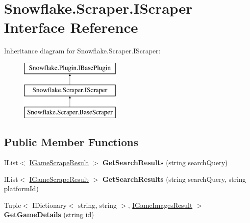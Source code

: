 \hypertarget{interface_snowflake_1_1_scraper_1_1_i_scraper}{}\section{Snowflake.\+Scraper.\+I\+Scraper Interface Reference}
\label{interface_snowflake_1_1_scraper_1_1_i_scraper}
Inheritance diagram for Snowflake.\+Scraper.\+I\+Scraper\+:\begin{figure}[H]
\begin{center}
\leavevmode
\includegraphics[height=3.000000cm]{interface_snowflake_1_1_scraper_1_1_i_scraper}
\end{center}
\end{figure}
\subsection*{Public Member Functions}
\begin{DoxyCompactItemize}
\item 
\hypertarget{interface_snowflake_1_1_scraper_1_1_i_scraper_a133e1a55dd154335843993d3f1166db3}{}I\+List$<$ \hyperlink{interface_snowflake_1_1_scraper_1_1_i_game_scrape_result}{I\+Game\+Scrape\+Result} $>$ {\bfseries Get\+Search\+Results} (string search\+Query)\label{interface_snowflake_1_1_scraper_1_1_i_scraper_a133e1a55dd154335843993d3f1166db3}

\item 
\hypertarget{interface_snowflake_1_1_scraper_1_1_i_scraper_aa72dd3d46e143253c31b8b99b9f2fb23}{}I\+List$<$ \hyperlink{interface_snowflake_1_1_scraper_1_1_i_game_scrape_result}{I\+Game\+Scrape\+Result} $>$ {\bfseries Get\+Search\+Results} (string search\+Query, string platform\+Id)\label{interface_snowflake_1_1_scraper_1_1_i_scraper_aa72dd3d46e143253c31b8b99b9f2fb23}

\item 
\hypertarget{interface_snowflake_1_1_scraper_1_1_i_scraper_a2ce05496e052fbb3b3e478813d7d6075}{}Tuple$<$ I\+Dictionary$<$ string, string $>$, \hyperlink{interface_snowflake_1_1_scraper_1_1_i_game_images_result}{I\+Game\+Images\+Result} $>$ {\bfseries Get\+Game\+Details} (string id)\label{interface_snowflake_1_1_scraper_1_1_i_scraper_a2ce05496e052fbb3b3e478813d7d6075}

\end{DoxyCompactItemize}
